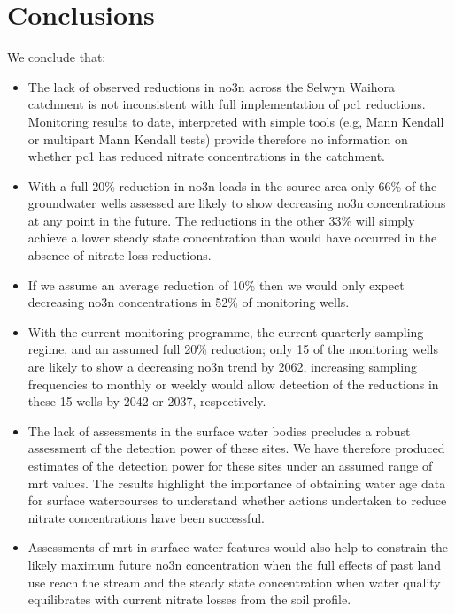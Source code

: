 \pagebreak
\section[Conclusions]{Conclusions} \label{sec:conclusions}

We conclude that:
\begin{itemize}
    \item The lack of observed reductions in \gls{no3n} across the Selwyn Waihora catchment is not inconsistent with full implementation of \gls{pc1} reductions. Monitoring results to date, interpreted with simple tools (e.g, Mann Kendall or multipart Mann Kendall tests) provide therefore no information on whether \gls{pc1} has reduced nitrate concentrations in the catchment.
    \item With a full 20\% reduction in \gls{no3n} loads in the source area only 66\% of the groundwater wells assessed are likely to show decreasing \gls{no3n} concentrations at any point in the future. The reductions in the other 33\% will simply achieve a lower steady state concentration than would have occurred in the absence of nitrate loss reductions.
    \item If we assume an average reduction of 10\% then we would only expect decreasing \gls{no3n} concentrations in 52\% of monitoring wells.
    \item With the current monitoring programme, the current quarterly sampling regime, and an assumed full 20\% reduction; only 15 of the monitoring wells are likely to show a decreasing \gls{no3n} trend by 2062, increasing sampling frequencies to monthly or weekly would allow detection of the reductions in these 15 wells by 2042 or 2037, respectively.
    \item The lack of  assessments in the surface water bodies precludes a robust assessment of the detection power of these sites. We have therefore produced estimates of the detection power for these sites under an assumed range of \gls{mrt} values. The results highlight the importance of obtaining water age data for surface watercourses to understand whether actions undertaken to reduce nitrate concentrations have been successful.
    \item Assessments of \gls{mrt} in surface water features would also help to constrain the likely maximum future \gls{no3n} concentration when the full effects of past land use reach the stream and the steady state concentration when water quality equilibrates with current nitrate losses from the soil profile.

\end{itemize}
